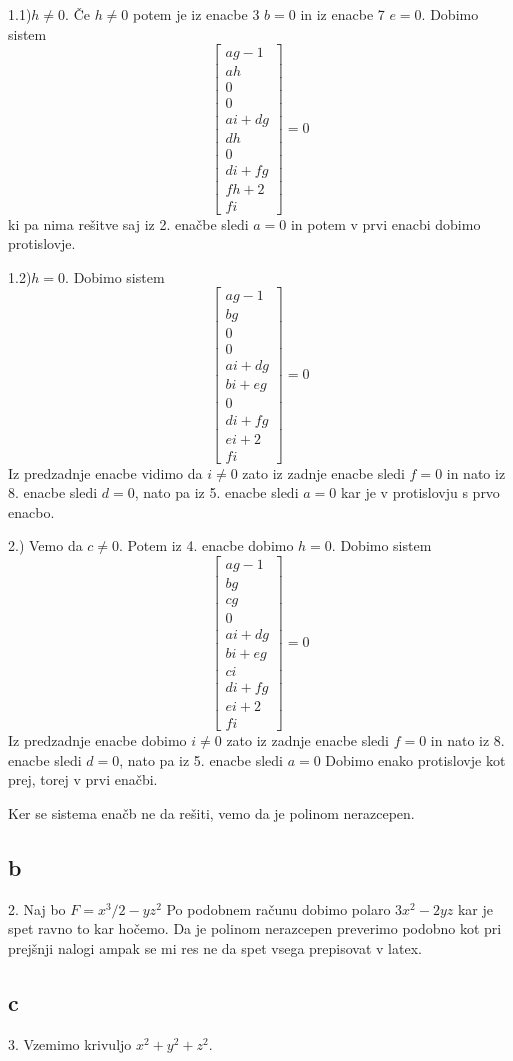 \documentclass[12pt]{article}
\begin{document}
1.1)$h\ne 0$. 
Če $h\ne 0$ potem je iz enacbe 3 $b=0$ in iz enacbe 7 $e=0$. Dobimo sistem $$\left[\begin{matrix}a g - 1\\a h\\0\\0\\a i + d g\\d h\\0\\d i + f g\\f h + 2\\f i\end{matrix}\right]=0$$
ki pa nima rešitve saj iz 2. enačbe sledi $a=0$ in potem v prvi enacbi dobimo protislovje. 

1.2)$h=0$.
Dobimo sistem $$\left[\begin{matrix}a g - 1\\b g\\0\\0\\a i + d g\\b i + e g\\0\\d i + f g\\e i + 2\\f i\end{matrix}\right]=0$$
Iz predzadnje enacbe vidimo da $i\ne 0$ zato iz zadnje enacbe sledi $f=0$ in nato iz 8. enacbe sledi $d=0$, nato pa iz 5. enacbe sledi $a=0$
kar je v protislovju s prvo enacbo.

2.) Vemo da $c\ne 0$. Potem iz 4. enacbe dobimo $h=0$. Dobimo sistem $$\left[\begin{matrix}a g - 1\\b g\\c g\\0\\a i + d g\\b i + e g\\c i\\d i + f g\\e i + 2\\f i\end{matrix}\right]=0$$
Iz predzadnje enacbe dobimo $i\ne 0$ zato iz zadnje enacbe sledi $f=0$ in nato iz 8. enacbe sledi $d=0$, nato pa iz 5. enacbe sledi $a=0$ Dobimo enako protislovje kot prej, torej v prvi enačbi.

Ker se sistema enačb ne da rešiti, vemo da je polinom nerazcepen.



\subsection{b}
2. Naj bo $F = x^3/2-yz^2$ Po podobnem računu dobimo polaro $3x^2-2yz$ kar je spet ravno to kar hočemo. Da je polinom nerazcepen preverimo
podobno kot pri prejšnji nalogi ampak se mi res ne da spet vsega prepisovat v latex.







\subsection{c}
3. Vzemimo krivuljo $x^2+y^2+z^2$. 
\end{document}
